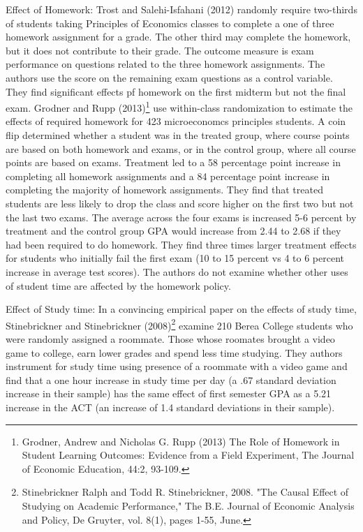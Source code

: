 \documentclass[12pt]{article}
\begin{document}
Effect of Homework:  Trost and Salehi-Isfahani (2012) randomly require two-thirds of students taking Principles of Economics classes to complete a one of three homework assignment for a grade.  The other third may complete the homework, but it does not contribute to their grade.  The outcome measure is exam performance on questions related to the three homework assignments.  The authors use the score on the remaining exam questions as a control variable. They find significant effects pf homework on the first midterm but not the final exam. Grodner and Rupp (2013)\footnote{Grodner, Andrew and Nicholas G. Rupp (2013) The Role of Homework in Student Learning Outcomes: Evidence from a Field Experiment, The Journal of Economic Education, 44:2, 93-109.} use within-class randomization to estimate the effects of required homework for 423 microeconomcs principles students.  A coin flip determined whether a student was in the treated group, where course points are based on both homework and exams, or in the control group, where all course points are based on exams.  Treatment led to a 58 percentage point increase in completing all homework assignments and a 84 percentage point increase in completing the majority of homework assignments. They find that treated students are less likely to drop the class and score higher on the first two but not the last two exams.  The average across the four exams is increased 5-6 percent by treatment and the control group GPA would increase from 2.44 to 2.68 if they had been required to do homework.  They find three times larger treatment effects for students who initially fail the first exam (10 to 15 percent vs 4 to 6 percent increase in average test scores).  The authors do not examine whether other uses of student time are affected by the homework policy.  

Effect of Study time: In a convincing empirical paper on the effects of study time, Stinebrickner and Stinebrickner (2008)\footnote{Stinebrickner Ralph and  Todd R. Stinebrickner, 2008. "The Causal Effect of Studying on Academic Performance," The B.E. Journal of Economic Analysis and Policy, De Gruyter, vol. 8(1), pages 1-55, June.} examine 210 Berea College students who were randomly assigned a roommate. Those whose roomates brought a video game to college, earn lower grades and spend less time studying.  They authors instrument for study time using presence of a roommate with a video game and find that a one hour increase in study time per day (a .67 standard deviation increase in their sample) has the same effect of first semester GPA as a 5.21 increase in the ACT (an increase of 1.4 standard deviations in their sample).  
\end{document}
